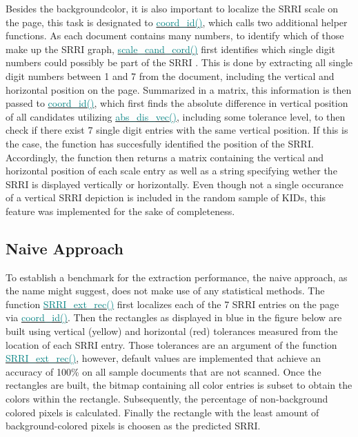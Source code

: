 \documentclass[aodsor,preprint]{imsart}
\numberwithin{equation}{section}
\theoremstyle{plain}
\begin{document}
Besides the backgroundcolor, it is also important to localize the SRRI scale on the page, this task is designated to \href{https://github.com/Base-R-Best-R/KID/blob/main/Code/Package/KIDs/R/background_col_id.R}{\textcolor{teal}{coord\_id()}}, which calls two additional helper functions. As each document contains many numbers, to identify which of those make up the SRRI graph, \href{https://github.com/Base-R-Best-R/KID/blob/main/Code/Package/KIDs/R/scale_cand_coord.R}{\textcolor{teal}{scale\_cand\_cord()}} first identifies which single digit numbers could possibly be part of the SRRI \citep{pdftools}. This is done by extracting all single digit numbers between 1 and 7 from the document, including the vertical and horizontal position on the page. Summarized in a matrix, this information is then passed to \href{https://github.com/Base-R-Best-R/KID/blob/main/Code/Package/KIDs/R/coord_id.R}{\textcolor{teal}{coord\_id()}}, which first finds the absolute difference in vertical position of all candidates utilizing \href{https://github.com/Base-R-Best-R/KID/blob/main/Code/Package/KIDs/R/abs_dis_vec.R}{\textcolor{teal}{abs\_dis\_vec()}}, including some tolerance level, to then check if there exist 7 single digit entries with the same vertical position. If this is the case, the function has succesfully identified the position of the SRRI. Accordingly, the function then returns a matrix containing the vertical and horizontal position of each scale entry as well as a string specifying wether the SRRI is displayed vertically or horizontally. Even though not a single occurance of a vertical SRRI depiction is included in the random sample of KIDs, this feature was implemented for the sake of completeness.

\subsection{Naive Approach}
To establish a benchmark for the extraction performance, the naive approach, as the name might suggest, does not make use of any statistical methods. The function \href{https://github.com/Base-R-Best-R/KID/blob/main/Code/Package/KIDs/R/SRRI_ext_rec.R}{\textcolor{teal}{SRRI\_ext\_rec()}} first localizes each of the 7 SRRI entries on the page via \href{https://github.com/Base-R-Best-R/KID/blob/main/Code/Package/KIDs/R/coord_id.R}{\textcolor{teal}{coord\_id()}}. Then the rectangles as displayed in blue in the figure below are built using vertical (yellow) and horizontal (red) tolerances measured from the location of each SRRI entry. Those tolerances are an argument of the function \href{https://github.com/Base-R-Best-R/KID/blob/main/Code/Package/KIDs/R/SRRI_ext_rec.R}{\textcolor{teal}{SRRI\_ext\_rec()}}, however, default values are implemented that achieve an accuracy of 100\% on all sample documents that are not scanned. Once the rectangles are built, the bitmap containing all color entries is subset to obtain the colors within the rectangle. Subsequently, the percentage of non-background colored pixels is calculated. Finally the rectangle with the least amount of background-colored pixels is choosen as the predicted SRRI.
\end{document}

